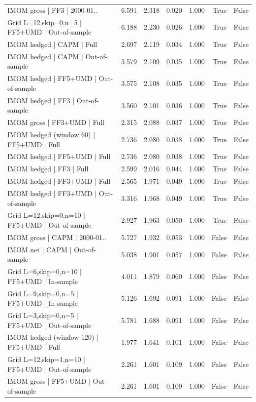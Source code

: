 \begin{tabular}{lrrrrrr}
IMOM gross | FF3 | 2000-01.. & 6.591 & 2.318 & 0.020 & 1.000 & True & False \\
Grid L=12,skip=0,n=5 | FF5+UMD | Out-of-sample & 6.188 & 2.230 & 0.026 & 1.000 & True & False \\
IMOM hedged | CAPM | Full & 2.697 & 2.119 & 0.034 & 1.000 & True & False \\
IMOM hedged | CAPM | Out-of-sample & 3.579 & 2.109 & 0.035 & 1.000 & True & False \\
IMOM hedged | FF5+UMD | Out-of-sample & 3.575 & 2.108 & 0.035 & 1.000 & True & False \\
IMOM hedged | FF3 | Out-of-sample & 3.560 & 2.101 & 0.036 & 1.000 & True & False \\
IMOM gross | FF3+UMD | Full & 2.315 & 2.088 & 0.037 & 1.000 & True & False \\
IMOM hedged (window 60) | FF5+UMD | Full & 2.736 & 2.080 & 0.038 & 1.000 & True & False \\
IMOM hedged | FF5+UMD | Full & 2.736 & 2.080 & 0.038 & 1.000 & True & False \\
IMOM hedged | FF3 | Full & 2.599 & 2.016 & 0.044 & 1.000 & True & False \\
IMOM hedged | FF3+UMD | Full & 2.565 & 1.971 & 0.049 & 1.000 & True & False \\
IMOM hedged | FF3+UMD | Out-of-sample & 3.316 & 1.968 & 0.049 & 1.000 & True & False \\
Grid L=12,skip=0,n=10 | FF5+UMD | Out-of-sample & 2.927 & 1.963 & 0.050 & 1.000 & True & False \\
IMOM gross | CAPM | 2000-01.. & 5.727 & 1.932 & 0.053 & 1.000 & False & False \\
IMOM net | CAPM | Out-of-sample & 5.038 & 1.901 & 0.057 & 1.000 & False & False \\
Grid L=6,skip=0,n=10 | FF5+UMD | In-sample & 4.011 & 1.879 & 0.060 & 1.000 & False & False \\
Grid L=9,skip=0,n=5 | FF5+UMD | In-sample & 5.126 & 1.692 & 0.091 & 1.000 & False & False \\
Grid L=3,skip=0,n=5 | FF5+UMD | Out-of-sample & 5.781 & 1.688 & 0.091 & 1.000 & False & False \\
IMOM hedged (window 120) | FF5+UMD | Full & 1.977 & 1.641 & 0.101 & 1.000 & False & False \\
Grid L=12,skip=1,n=10 | FF5+UMD | Out-of-sample & 2.261 & 1.601 & 0.109 & 1.000 & False & False \\
IMOM gross | FF5+UMD | Out-of-sample & 2.261 & 1.601 & 0.109 & 1.000 & False & False \\

\end{tabular}
